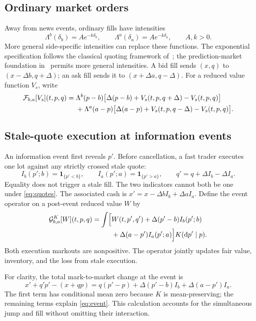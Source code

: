 \documentclass[11pt]{article}
\newcommand{\1}{\mathbf 1}
\newcommand{\dd}{\mathrm d}
\newcommand{\F}{\mathcal F}
\newcommand{\G}{\mathcal G}
\begin{document}
\subsection{Ordinary market orders}
Away from news events, ordinary fills have intensities
\begin{equation}
 \Lambda^b(\delta_b)=Ae^{-k\delta_b},\qquad
 \Lambda^a(\delta_a)=Ae^{-k\delta_a},\qquad A,k>0.
\end{equation}
More general side-specific intensities can replace these functions. The
exponential specification follows the classical quoting framework
of~\cite{avellanedastoikov2008}; the prediction-market foundation
in~\cite{feilnendel2026} permits more general intensities.
A bid fill sends $(x,q)$ to $(x-\Delta b,q+\Delta)$; an ask fill sends it
to $(x+\Delta a,q-\Delta)$. For a reduced value function $V_s$, write
\begin{align}
 \F_{b,a}[V_s](t,p,q)={}&
 \Lambda^b(p-b)\bigl[\Delta(p-b)+V_s(t,p,q+\Delta)-V_s(t,p,q)\bigr]
 \notag\\
 &+\Lambda^a(a-p)\bigl[\Delta(a-p)+V_s(t,p,q-\Delta)-V_s(t,p,q)\bigr].
 \label{eq:fills}
\end{align}

\subsection{Stale-quote execution at information events}
\label{sec:stale}
An information event first reveals $p'$. Before cancellation, a fast trader
executes one lot against any strictly crossed stale quote:
\begin{equation}
 I_b(p';b)=\1_{\{p'<b\}},\qquad I_a(p';a)=\1_{\{p'>a\}},\qquad
 q'=q+\Delta I_b-\Delta I_a.
\end{equation}
Equality does not trigger a stale fill. The two indicators cannot both be one
under \eqref{eq:quotes}. The associated cash is
$x'=x-\Delta b I_b+\Delta a I_a$.
Define the event operator on a post-event reduced value $W$ by
\begin{align}
 \G^K_{b,a}[W](t,p,q)=\int\Bigl[
 &W(t,p',q')+\Delta(p'-b)I_b(p';b)
 \notag\\[-2pt]
 &+\Delta(a-p')I_a(p';a)\Bigr]K(\dd p'\mid p).
 \label{eq:event}
\end{align}
Both execution markouts are nonpositive. The operator jointly updates fair
value, inventory, and the loss from stale execution.

For clarity, the total mark-to-market change at the event is
\begin{equation}
 x'+q'p'-(x+qp)
 =q(p'-p)+\Delta(p'-b)I_b+\Delta(a-p')I_a.
\end{equation}
The first term has conditional mean zero because $K$ is mean-preserving;
the remaining terms explain \eqref{eq:event}. This calculation accounts for
the simultaneous jump and fill without omitting their interaction.
\end{document}
